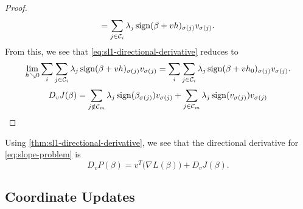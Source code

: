 \begin{proof}
\[    = \sum_{j \in \mathcal{C}_i} \lambda_j\operatorname{sign}(\beta + vh)_{\sigma(j)}v_{\sigma(j)}.
  \]
  From this, we see that \eqref{eq:sl1-directional-derivative} reduces to
  \[
    \lim_{h \searrow 0} \sum_i \sum_{j \in \mathcal{C}_i} \lambda_j\operatorname{sign}(\beta + vh)_{\sigma(j)}v_{\sigma(j)}
    = \sum_i \sum_{j \in \mathcal{C}_i} \lambda_j\operatorname{sign}(\beta + vh_0)_{\sigma(j)}v_{\sigma(j)}.
  \]
  \begin{equation*}
    D_v J(\beta) = \sum_{j \notin \mathcal{C}_m} \lambda_j \operatorname{sign} (\beta_{\sigma(j)}) v_{\sigma(j)}
      +
    \sum_{j \in \mathcal{C}_m} \lambda_j \operatorname{sign} (v_{\sigma(j)}) v_{\sigma(j)}
  \end{equation*}
\end{proof}

\begin{remark}
  Using \cref{thm:sl1-directional-derivative}, we see that
  the directional derivative for \eqref{eq:slope-problem} is
  \[
    D_v P(\beta) = v^T \big(\nabla L(\beta)\big) + D_v J(\beta).
  \]
\end{remark}

\subsection{Coordinate Updates}%
\label{sec:coordinate-updates}

